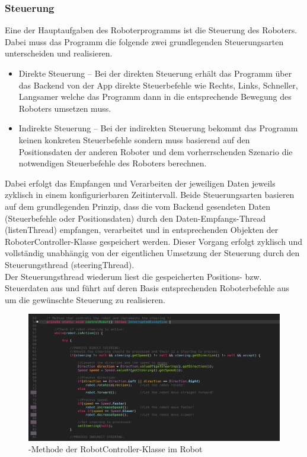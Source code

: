 \subsubsection{Steuerung}\label{robotsteuerung}
Eine der Hauptaufgaben des Roboterprogramms ist die Steuerung des Roboters. Dabei muss das Programm die folgende zwei 
grundlegenden Steuerungsarten unterscheiden und realisieren.
\begin{itemize}
	\item{Direkte Steuerung} -- Bei der direkten Steuerung erhält das Programm über das Backend von der App direkte Steuerbefehle wie
	Rechts, Links, Schneller, Langsamer welche das Programm dann in die entsprechende Bewegung des Roboters umsetzen muss.
	\item{Indirekte Steuerung} -- Bei der indirekten Steuerung bekommt das Programm keinen konkreten Steuerbefehle sondern muss basierend
	auf den Positionsdaten der anderen Roboter und dem vorherrschenden Szenario die notwendigen Steuerbefehle des Roboters berechnen.
\end{itemize}
Dabei erfolgt das Empfangen und Verarbeiten der jeweiligen Daten jeweils zyklisch in einem konfigurierbaren Zeitintervall. Beide Steuerungsarten
basieren auf dem grundlegenden Prinzip, dass die vom Backend gesendeten Daten (Steuerbefehle oder Positionsdaten) durch den 
Daten-Empfangs-Thread (listenThread) empfangen, verarbeitet und in entsprechenden Objekten der RoboterController-Klasse gespeichert werden. 
Dieser Vorgang erfolgt zyklisch und vollständig unabhängig von der eigentlichen Umsetzung der Steuerung durch den Steuerungsthread (steeringThread). \\
Der Steuerungsthread wiederum liest die gespeicherten Positions- bzw. Steuerdaten aus und führt auf deren Basis entsprechenden Roboterbefehle 
aus um die gewünschte Steuerung zu realisieren.
\begin{figure}[ht]
	\centering
	\includegraphics[width=1.0\textwidth]{images/implementation/controlRobotMethod1.png}
	\caption[-Methode der RobotController-Klasse im Robot]{-Methode der RobotController-Klasse im Robot}
\end{figure}

